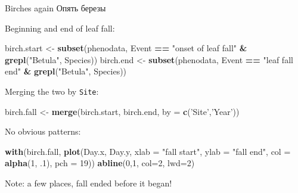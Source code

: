 \documentclass[9pt,ignorenonframetext,aspectratio=169]{beamer}
\newenvironment{Shaded}{\begin{snugshade}}{\end{snugshade}}
\newcommand{\DataTypeTok}[1]{\textcolor[rgb]{0.13,0.29,0.53}{#1}}
\newcommand{\DecValTok}[1]{\textcolor[rgb]{0.00,0.00,0.81}{#1}}
\newcommand{\FloatTok}[1]{\textcolor[rgb]{0.00,0.00,0.81}{#1}}
\newcommand{\KeywordTok}[1]{\textcolor[rgb]{0.13,0.29,0.53}{\textbf{#1}}}
\newcommand{\NormalTok}[1]{#1}
\newcommand{\OperatorTok}[1]{\textcolor[rgb]{0.81,0.36,0.00}{\textbf{#1}}}
\newcommand{\StringTok}[1]{\textcolor[rgb]{0.31,0.60,0.02}{#1}}
\begin{document}
\begin{frame}[fragile]{Birches again \textbar{} Опять березы}
\protect\hypertarget{birches-again--}{}

\bcols{}

Beginning and end of leaf fall:

\scriptsize

\begin{Shaded}
\begin{Highlighting}[]
\NormalTok{birch.start <-}\StringTok{ }\KeywordTok{subset}\NormalTok{(phenodata, }
\NormalTok{                      Event }\OperatorTok{==}\StringTok{ "onset of leaf fall"} \OperatorTok{&}\StringTok{ }\KeywordTok{grepl}\NormalTok{(}\StringTok{"Betula"}\NormalTok{, Species))}
\NormalTok{birch.end <-}\StringTok{ }\KeywordTok{subset}\NormalTok{(phenodata, }
\NormalTok{                    Event }\OperatorTok{==}\StringTok{ "leaf fall end"} \OperatorTok{&}\StringTok{ }\KeywordTok{grepl}\NormalTok{(}\StringTok{"Betula"}\NormalTok{, Species))}
\end{Highlighting}
\end{Shaded}

\normalsize

Merging the two by \texttt{Site}:

\scriptsize

\begin{Shaded}
\begin{Highlighting}[]
\NormalTok{birch.fall <-}\StringTok{ }\KeywordTok{merge}\NormalTok{(birch.start, birch.end, }\DataTypeTok{by =} \KeywordTok{c}\NormalTok{(}\StringTok{'Site'}\NormalTok{,}\StringTok{'Year'}\NormalTok{))}
\end{Highlighting}
\end{Shaded}


No obvious patterns:

\scriptsize

\begin{Shaded}
\begin{Highlighting}[]
\KeywordTok{with}\NormalTok{(birch.fall, }\KeywordTok{plot}\NormalTok{(Day.x, Day.y, }\DataTypeTok{xlab =} \StringTok{"fall start"}\NormalTok{, }\DataTypeTok{ylab =} \StringTok{"fall end"}\NormalTok{, }\DataTypeTok{col =} \KeywordTok{alpha}\NormalTok{(}\DecValTok{1}\NormalTok{, }\FloatTok{.1}\NormalTok{), }\DataTypeTok{pch =} \DecValTok{19}\NormalTok{))}
\KeywordTok{abline}\NormalTok{(}\DecValTok{0}\NormalTok{,}\DecValTok{1}\NormalTok{, }\DataTypeTok{col=}\DecValTok{2}\NormalTok{, }\DataTypeTok{lwd=}\DecValTok{2}\NormalTok{)}
\end{Highlighting}
\end{Shaded}

\normalsize Note: a few places, fall ended before it began!

\ecols

\end{frame}
\end{document}
